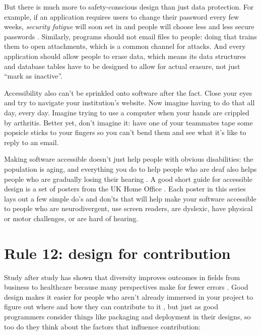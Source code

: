 \documentclass[10pt,letterpaper]{article}
\begin{document}
But there is much more to safety-conscious design than just data protection.
For example,
if an application requires users to change their password every few weeks,
\emph{security fatigue} will soon set in
and people will choose less and less secure passwords \cite{Smalls2021}.
Similarly,
programs should not email files to people:
doing that trains them to open attachments,
which is a common channel for attacks.
And every application should allow people to erase data,
which means its data structures and database tables have to be designed to allow for actual erasure,
not just ``mark as inactive''.

Accessibility also can't be sprinkled onto software after the fact.
Close your eyes and try to navigate your institution's website.
Now imagine having to do that all day, every day.
Imagine trying to use a computer when your hands are crippled by arthritis.
Better yet, don't imagine it:
have one of your teammates tape some popsicle sticks to your fingers so you can't bend them
and see what it's like to reply to an email.

Making software accessible doesn't just help people with obvious disabilities:
the population is aging,
and everything you do to help people who are deaf also helps people
who are gradually losing their hearing \cite{Johnson2017}.
A good short guide for accessible design is a set of posters from the UK Home Office \cite{UKHO}.
Each poster in this series lays out a few simple do's and don'ts that will help make your software accessible
to people who are neurodivergent,
use screen readers,
are dyslexic,
have physical or motor challenges, or are hard of hearing.

\section*{Rule 12: design for contribution}

Study after study has shown that diversity improves outcomes in fields from business to healthcare
because many perspectives make for fewer errors \cite{Gompers2018,Gomez2019}.
Good design makes it easier for people who aren't already immersed in your project
to figure out where and how they can contribute to it \cite{Sholler2019},
but just as good programmers consider things like packaging and deployment in their designs,
so too do they think about the factors that influence contribution:
\end{document}
